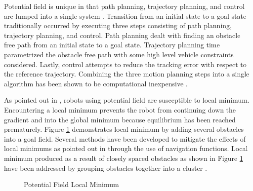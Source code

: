 \documentclass[numbered,pdftex]{ohio-etd}
\begin{document}
Potential field is unique in that path planning, trajectory planning, and control are lumped into a single system \cite{rimon_exact_1992}. Transition from an initial state to a goal state traditionally occurred by executing three steps consisting of path planning, trajectory planning, and control. Path planning dealt with finding an obstacle free path from an initial state to a goal state. Trajectory planning time parametrized the obstacle free path with some high level vehicle constraints considered. Lastly, control attempts to reduce the tracking error with respect to the reference trajectory. Combining the three motion planning steps into a single algorithm has been shown to be computational inexpensive \cite{goerzen_survey_2010}. 

As pointed out in \cite{borenstein_real-time_1990}, robots using potential field are susceptible to local minimum. Encountering a local minimum prevents the robot from continuing down the gradient and into the global minimum because equilibrium has been reached prematurely. Figure \ref{fig:pfLocalMin} demonstrates local minimum by adding several obstacles into a goal field. Several methods have been developed to mitigate the effects of local minimums as pointed out in \cite{goerzen_survey_2010} through the use of navigation functions. Local minimum produced as a result of closely spaced obstacles as shown in Figure \ref{fig:pfLocalMin} have been addressed by grouping obstacles together into a cluster \cite{liu_virtual-waypoint_2016}.

\begin{figure}[h]
	\begin{subfigmatrix}{2}%
		\centering
	\end{subfigmatrix}
	\caption{Potential Field Local Minimum \cite{liu_virtual-waypoint_2016}}
	\label{fig:pfLocalMin}
\end{figure}
\end{document}
